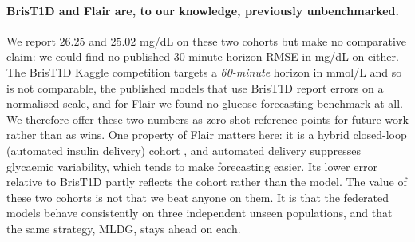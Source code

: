 \documentclass[10pt,letterpaper]{article}
\begin{document}
\paragraph{BrisT1D and Flair are, to our knowledge, previously unbenchmarked.}
We report $26.25$ and $25.02$ mg/dL on these two cohorts but make no
comparative claim: we could find no published 30-minute-horizon RMSE in mg/dL
on either. The BrisT1D Kaggle competition \cite{kaggle2024brist1d} targets a
\emph{60-minute} horizon in mmol/L and so is not comparable, the published
models that use BrisT1D report errors on a normalised scale, and for Flair we
found no glucose-forecasting benchmark at all. We therefore offer these two
numbers as zero-shot reference points for future work rather than as wins.
One property of Flair matters here: it is a hybrid closed-loop (automated
insulin delivery) cohort \cite{bergenstal2021flair}, and automated delivery
suppresses glycaemic variability, which tends to make forecasting easier. Its
lower error relative to BrisT1D partly reflects the cohort rather than the
model. The value of
these two cohorts is not that we beat anyone on them. It is that the
federated models behave consistently on three independent unseen populations,
and that the same strategy, MLDG, stays ahead on each.
\end{document}
